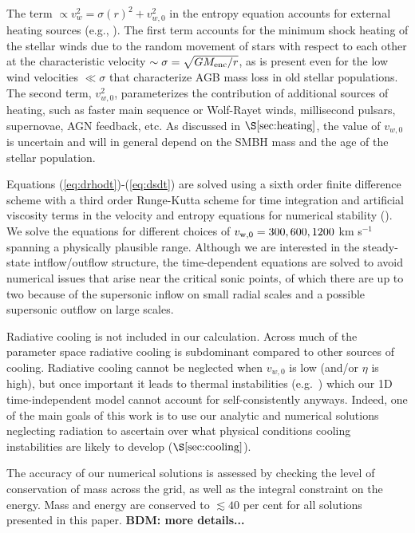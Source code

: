 \documentclass[usenatbib,fleqn]{mn2e}
\newcommand{\vw}{v_w}
\newcommand{\vwO}{v_{w,0}}
\begin{document}
The term $\propto \vw^2 = \sigma(r)^2+v_{w,0}^2$ in the entropy equation accounts for external heating sources (e.g., \citealt{ShcherbakovWong+:2014a}).  The first term accounts for the minimum shock heating of the stellar winds due to the random movement of stars with respect to each other at the characteristic velocity $\sim \sigma = \sqrt{GM_{\rm enc}/r}$, as is present even for the low wind velocities $\ll \sigma$ that characterize AGB mass loss in old stellar populations.  The second term, $v_{w,0}^{2}$, parameterizes the contribution of additional sources of heating, such as faster main sequence or Wolf-Rayet winds, millisecond pulsars, supernovae, AGN feedback, etc.  As discussed in $\S\ref{sec:heating}$, the value of $v_{w,0}$ is uncertain and will in general depend on the SMBH mass and the age of the stellar population.

Equations (\ref{eq:drhodt})-(\ref{eq:dsdt}) are solved using a sixth
order finite difference scheme with a third order Runge-Kutta scheme
for time integration and artificial viscosity terms in the velocity
and entropy equations for numerical stability (\citealt{Brandenburg:2003a}).  We solve the equations for different choices of $v_{\rm w,0} = 300, 600, 1200$ km s$^{-1}$ spanning a physically plausible
range.  Although we are interested in the steady-state intflow/outflow structure, the time-dependent equations are solved to avoid numerical issues that arise near the critical sonic points, of which there are up to two because of the supersonic inflow on small radial scales and a possible supersonic outflow on large scales.

Radiative cooling is not included in our calculation.  Across much of the parameter space radiative cooling is subdominant compared to other sources of cooling.  Radiative cooling cannot be neglected when $\vwO$ is low (and/or $\eta$ is high), but once important it leads to thermal instabilities (e.g.~\citealt{McCourt+12}) which our 1D time-independent model cannot account for self-consistently anyways.  Indeed, one of the main goals of this work is to use our analytic and numerical solutions neglecting radiation to ascertain over what physical conditions cooling instabilities are likely to develop ($\S\ref{sec:cooling}$).

The accuracy of our numerical solutions is assessed by checking the level of conservation of mass across the grid, as well as the integral constraint on the energy.  Mass and energy are conserved to $\lesssim
40$ per cent for all solutions presented in this paper. 
{\bf BDM: more details...}
\end{document}
